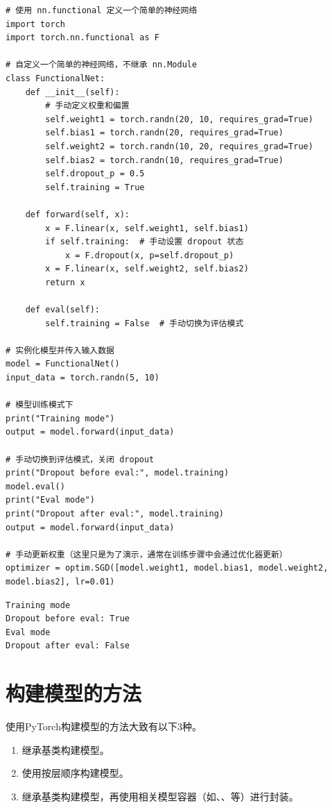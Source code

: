 \begin{lstlisting}[style=pythonstyle]
# 使用 nn.functional 定义一个简单的神经网络
import torch
import torch.nn.functional as F

# 自定义一个简单的神经网络，不继承 nn.Module
class FunctionalNet:
    def __init__(self):
        # 手动定义权重和偏置
        self.weight1 = torch.randn(20, 10, requires_grad=True)
        self.bias1 = torch.randn(20, requires_grad=True)
        self.weight2 = torch.randn(10, 20, requires_grad=True)
        self.bias2 = torch.randn(10, requires_grad=True)
        self.dropout_p = 0.5
        self.training = True

    def forward(self, x):
        x = F.linear(x, self.weight1, self.bias1)
        if self.training:  # 手动设置 dropout 状态
            x = F.dropout(x, p=self.dropout_p)
        x = F.linear(x, self.weight2, self.bias2)
        return x

    def eval(self):
        self.training = False  # 手动切换为评估模式

# 实例化模型并传入输入数据
model = FunctionalNet()
input_data = torch.randn(5, 10)

# 模型训练模式下
print("Training mode")
output = model.forward(input_data)

# 手动切换到评估模式，关闭 dropout
print("Dropout before eval:", model.training)
model.eval()
print("Eval mode")
print("Dropout after eval:", model.training)
output = model.forward(input_data)

# 手动更新权重（这里只是为了演示，通常在训练步骤中会通过优化器更新）
optimizer = optim.SGD([model.weight1, model.bias1, model.weight2, model.bias2], lr=0.01)
\end{lstlisting}
\begin{lstlisting}[style=demostyle,numbers=none] 
Training mode
Dropout before eval: True
Eval mode
Dropout after eval: False
\end{lstlisting}    


\section{构建模型的方法}
\label{subsec:Pytorch_build_model}
使用PyTorch构建模型的方法大致有以下3种。
\begin{enumerate}[label=\arabic*)]
    \item 继承基类构建模型。
    \item 使用按层顺序构建模型。
    \item 继承基类构建模型，再使用相关模型容器（如、、等）进行封装。
\end{enumerate}

